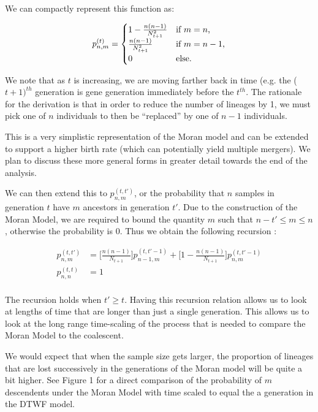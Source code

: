 \documentclass[11pt]{article}
\begin{document}
We can compactly represent this function as:

\begin{equation*}
	p^{(t)}_{n,m} = 
	\begin{cases} 1 - \frac{n(n-1)}{N^2_{t+1}}  & \text{if $m = n$,}
		\\
		\frac{n(n-1)}{N^2_{t+1}} &\text{if $ m = n - 1$,}
		\\
		0 &\text{else.}
	\end{cases}
\end{equation*}

We note that as $t$ is increasing, we are moving farther back in time (e.g. the ($t+1)^{th}$ generation is gene generation immediately before the $t^{th}$. The rationale for the derivation is that in order to reduce the number of lineages by 1, we must pick one of $n$ individuals to then be ``replaced'' by one of $n-1$ individuals. 

This is a very simplistic representation of the Moran model and can be extended to support a higher birth rate (which can potentially yield multiple mergers). We plan to discuss these more general forms in greater detail towards the end of the analysis. 

We can then extend this to $p^{(t, t')}_{n,m}$, or the probability that $n$ samples in generation $t$ have $m$  ancestors in generation $t'$. Due to the construction of the Moran Model, we are required to bound the quantity $m$ such that $n-t' \leq m \leq n$, otherwise the probability is $0$. Thus we obtain the following recursion :

$$
\begin{aligned}
	p^{(t, t')}_{n,m} &= \Bigg[\frac{n(n-1)}{N_{t+1}}\Bigg] p^{(t, t'-1)}_{n-1, m} + \Bigg[1 - \frac{n(n-1)}{N_{t+1}}\Bigg] p^{(t, t'-1)}_{n,m}\\
	p^{(t, t)}_{n,n} &= 1\\
\end{aligned}
$$

The recursion holds when $t' \geq t$. Having this recursion relation allows us to look at lengths of time that are longer than just a single generation. This allows us to look at the long range time-scaling of the process that is needed to compare the Moran Model to the coalescent.  

We would expect that when the sample size gets larger, the proportion of lineages that are lost successively in the generations of the Moran model will be quite a bit higher. See Figure 1 for a direct comparison of the probability of $m$ descendents under the Moran Model with time scaled to equal the a generation in the DTWF model. 
\end{document}
